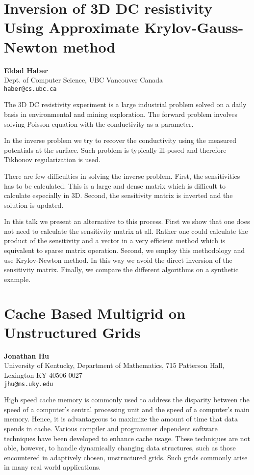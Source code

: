 \documentclass[11pt]{article}
\newcommand{\nextab}[4]{
	\section{#2}
	{\bf #1} \\ \nopagebreak
	{#3} \\ \nopagebreak
	{\tt #4} \nopagebreak
	}
\begin{document}

\nextab{Eldad Haber}
	{Inversion of 3D DC resistivity Using Approximate
		Krylov-Gauss-Newton method}
	{Dept. of Computer Science, UBC Vancouver Canada}
	{haber@cs.ubc.ca}

The 3D DC resistivity experiment is a large industrial problem solved on a daily basis in environmental and mining exploration. The forward problem involves solving
Poisson equation with the conductivity as a parameter.

In the inverse problem we try to recover the conductivity using the measured
potentials at the surface. Such problem is typically ill-posed and therefore
Tikhonov regularization is used.

There are few difficulties in solving the inverse problem. First, the
sensitivities has to be calculated. This is a large and dense matrix
which  is difficult to calculate especially in 3D. Second, the sensitivity
matrix is inverted and the solution is updated.

In this talk we present an alternative to this process. First we show
that one does not need to calculate the sensitivity matrix at all.
Rather one could calculate the product of the sensitivity and a vector
in a very efficient method which is equivalent to sparse matrix operation.
Second, we employ this methodology and use Krylov-Newton method. In this
way we avoid the direct inversion of the sensitivity matrix.
Finally, we compare  the different algorithms on a synthetic example.


\nextab{Jonathan Hu}
	{Cache Based Multigrid on Unstructured Grids}
	{University of Kentucky, Department of Mathematics,
		715 Patterson Hall, Lexington KY 40506-0027}
	{jhu@ms.uky.edu}

High speed cache memory is commonly used to address the disparity between the
speed of a computer's central processing unit and the speed of a computer's
main memory.  Hence, it is advantageous to maximize the amount of time that
data spends in cache.  Various compiler and programmer dependent software
techniques have been developed to enhance cache usage.  These techniques are
not able, however, to handle dynamically changing data structures, such as
those encountered in adaptively chosen, unstructured grids.  Such grids
commonly arise in many real world applications.
\end{document}
